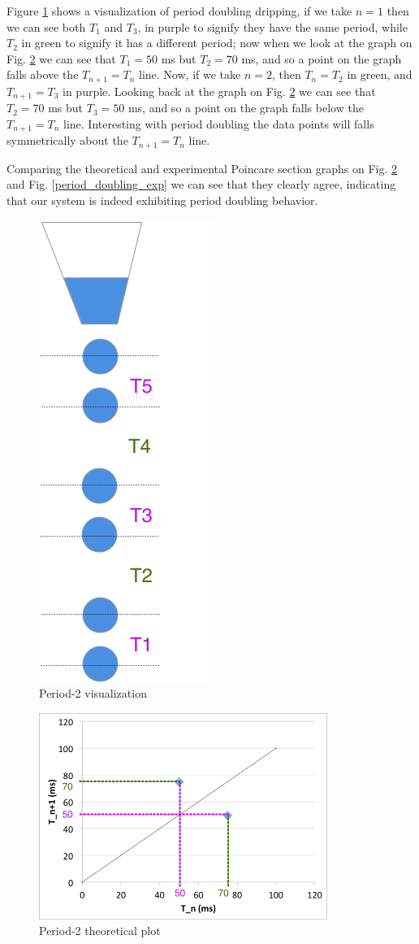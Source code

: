 \documentclass[11pt]{article}
\begin{document}
\newpage
Figure \ref{double_schematic} shows a visualization of period doubling dripping, if we take $n = 1$ then we can see both $T_1$ and $T_3$, in purple to signify they have the same period, while $T_2$ in green to signify it has a different period; now when we look at the graph on Fig. \ref{period_doubling_th} we can see that $T_1 = 50$ ms but $T_2 = 70$ ms, and so a point on the graph falls above the $T_{n+1} = T_n$ line. Now, if we take $n = 2$, then $T_n = T_2$ in green, and $T_{n+1} = T_3$ in purple. Looking back at the graph on Fig. \ref{period_doubling_th} we can see that $T_2 = 70$ ms but $T_3 = 50$ ms, and so a point on the graph falls below the $T_{n+1} = T_n$ line. Interesting with period doubling the data points will falls symmetrically about the $T_{n+1} = T_n$ line.

Comparing the theoretical and experimental Poincare section graphs on Fig. \ref{period_doubling_th} and Fig. \ref{period_doubling_exp} we can see that they clearly agree, indicating that our system is indeed exhibiting period doubling behavior.

\newpage
\begin{figure}[htp]
\begin{center}
\includegraphics[width=.9in]{figs/double_schematic}
\caption{ Period-2 visualization}
\label{double_schematic}
\end{center}
\end{figure}

\begin{figure}[htp]
\begin{center}
\includegraphics[width=3.7in]{figs/period_doubling_th}
\caption{ Period-2 theoretical plot}
\label{period_doubling_th}
\end{center}
\end{figure}
\end{document}
